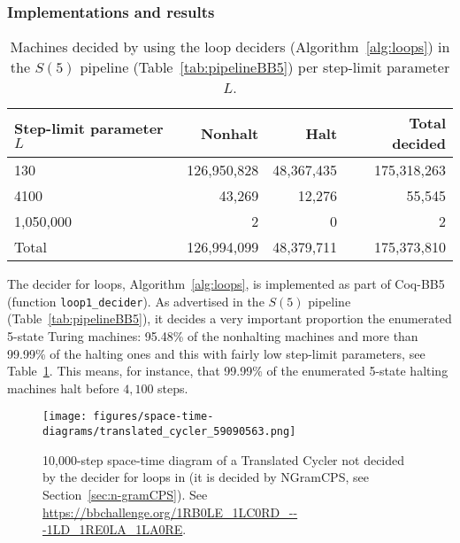 \subsubsection{Implementations and results}\label{sec:loops:results}

\begin{table}[h!]
  \centering
  \begin{tabular}{|l|rrr|}
    \hline
    Step-limit parameter $L$ & Nonhalt     & Halt       & Total decided \\
    \hline
    130                      & 126,950,828 & 48,367,435 & 175,318,263   \\
    4100                     & 43,269      & 12,276     & 55,545        \\
    1,050,000                & 2           & 0          & 2             \\ \hline
    Total                    & 126,994,099 & 48,379,711 & 175,373,810   \\
    \hline
  \end{tabular}
  \caption{Machines decided by using the loop deciders (Algorithm~\ref{alg:loops}) in the $S(5)$ pipeline (Table~\ref{tab:pipelineBB5}) per step-limit parameter $L$.}\label{tab:paramsLoops}
\end{table}

The decider for loops, Algorithm~\ref{alg:loops}, is implemented as part of Coq-BB5 (function \texttt{loop1\_decider}). As advertised in the $S(5)$ pipeline (Table~\ref{tab:pipelineBB5}), it decides a very important proportion the enumerated 5-state Turing machines: 95.48\% of the nonhalting machines and more than 99.99\% of the halting ones and this with fairly low step-limit parameters, see Table~\ref{tab:paramsLoops}. This means, for instance, that 99.99\% of the enumerated 5-state halting machines halt before $4,100$ steps.

\begin{figure}
  \centering
  \texttt{[image: figures/space-time-diagrams/translated\_cycler\_59090563.png]}

  \caption{10,000-step space-time diagram of a Translated Cycler not decided by the decider for loops in \CoqBB (it is decided by NGramCPS, see Section~\ref{sec:n-gramCPS}). See \url{https://bbchallenge.org/1RB0LE_1LC0RD_---1LD_1RE0LA_1LA0RE}.}\label{fig:translated-cyclers-more}
\end{figure}


